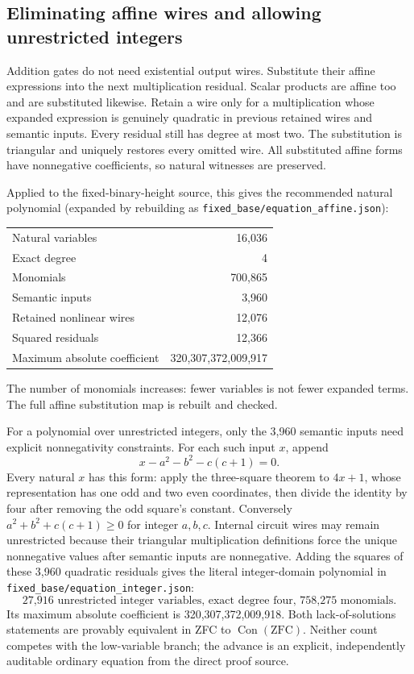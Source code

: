 \subsection{Eliminating affine wires and allowing unrestricted integers}

Addition gates do not need existential output wires. Substitute their
affine expressions into the next multiplication residual. Scalar products
are affine too and are substituted likewise. Retain a wire only for a
multiplication whose expanded expression is genuinely quadratic in
previous retained wires and semantic inputs. Every residual still has
degree at most two. The substitution is triangular and uniquely
restores every omitted wire. All substituted affine forms have
nonnegative coefficients, so natural witnesses are preserved.

Applied to the fixed-binary-height source, this gives the recommended
natural polynomial (expanded by rebuilding as
\texttt{fixed\_base/equation\_affine.json}):
\begin{center}
\begin{tabular}{lr}
Natural variables & 16,036\\
Exact degree & 4\\
Monomials & 700,865\\
Semantic inputs & 3,960\\
Retained nonlinear wires & 12,076\\
Squared residuals & 12,366\\
Maximum absolute coefficient & 320,307,372,009,917
\end{tabular}
\end{center}
The number of monomials increases: fewer variables is not fewer expanded
terms. The full affine substitution map is rebuilt and checked.

For a polynomial over unrestricted integers, only the 3,960 semantic
inputs need explicit nonnegativity constraints. For each such input $x$,
append
\[
 x-a^2-b^2-c(c+1)=0.
\]
Every natural $x$ has this form: apply the three-square theorem to
$4x+1$, whose representation has one odd and two even coordinates, then
divide the identity by four after removing the odd square's constant.
Conversely $a^2+b^2+c(c+1)\geq0$ for integer $a,b,c$.
Internal circuit wires may remain unrestricted because their triangular
multiplication definitions force the unique nonnegative values after
semantic inputs are nonnegative. Adding the squares of these 3,960
quadratic residuals gives the literal integer-domain polynomial in
\texttt{fixed\_base/equation\_integer.json}:
\[
 \boxed{\text{27,916 unrestricted integer variables, exact degree four,
 758,275 monomials.}}
\]
Its maximum absolute coefficient is 320,307,372,009,918.
Both lack-of-solutions statements are provably equivalent in ZFC to
$\operatorname{Con}(\mathrm{ZFC})$. Neither count competes with the
low-variable branch; the advance is an explicit, independently auditable
ordinary equation from the direct proof source.

